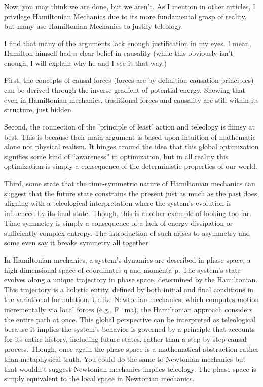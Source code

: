 Now, you may think we are done, but we aren’t. As I mention in other articles, I privilege Hamiltonian Mechanics due to its more fundamental grasp of reality, but many use Hamiltonian Mechanics to justify teleology.

I find that many of the arguments lack enough justification in my eyes. I mean, Hamilton himself had a clear belief in causality (while this obviously isn't enough, I will explain why he and I see it that way.)

First, the concepts of causal forces (forces are by definition causation principles) can be derived through the inverse gradient of potential energy. Showing that even in Hamiltonian mechanics, traditional forces and causality are still within its structure, just hidden.

Second, the connection of the 'principle of least' action and teleology is flimsy at best. This is because their main argument is based upon intuition of mathematic alone not physical realism. It hinges around the idea that this global optimization signifies some kind of “awareness” in optimization, but in all reality this optimization is simply a consequence of the deterministic properties of our world.

Third, some state that the time-symmetric nature of Hamiltonian mechanics can suggest that the future state constrains the present just as much as the past does, aligning with a teleological interpretation where the system’s evolution is influenced by its final state. Though, this is another example of looking too far. Time symmetry is simply a consequence of a lack of energy dissipation or sufficiently complex entropy. The introduction of such arises to asymmetry and some even say it breaks symmetry all together.

In Hamiltonian mechanics, a system’s dynamics are described in phase space, a high-dimensional space of coordinates q and momenta p. The system’s state evolves along a unique trajectory in phase space, determined by the Hamiltonian. This trajectory is a holistic entity, defined by both initial and final conditions in the variational formulation. Unlike Newtonian mechanics, which computes motion incrementally via local forces (e.g., F=ma), the Hamiltonian approach considers the entire path at once. This global perspective can be interpreted as teleological because it implies the system’s behavior is governed by a principle that accounts for its entire history, including future states, rather than a step-by-step causal process. Though, once again the phase space is a mathematical abstraction rather than metaphysical truth. You could do the same to Newtonian mechanics but that wouldn’t suggest Newtonian mechanics implies teleology. The phase space is simply equivalent to the local space in Newtonian mechanics.
